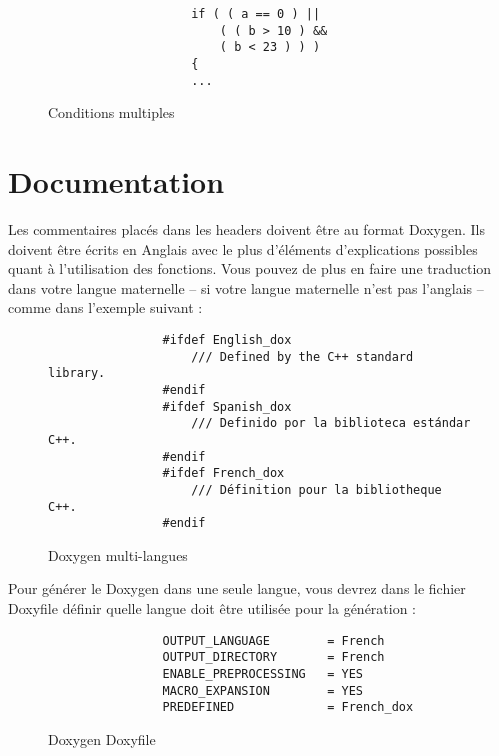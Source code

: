 			\begin{figure}[H]
				\begin{changemargin}{-2.5cm}{-2.5cm}
				\begin{tcolorbox}
				\begin{verbatim}
					if ( ( a == 0 ) ||
					    ( ( b > 10 ) &&
					    ( b < 23 ) ) )
					{
					...
				\end{verbatim}
				\end{tcolorbox}
				\end{changemargin}
				\caption{Conditions multiples}
			\end{figure}

	\section{Documentation}
		Les commentaires placés dans les headers doivent être au format Doxygen. Ils doivent être écrits en Anglais avec le plus d'éléments d'explications possibles quant à l'utilisation des fonctions. Vous pouvez de plus en faire une traduction dans votre langue maternelle -- si votre langue maternelle n'est pas l'anglais -- comme dans l'exemple suivant :

		\begin{figure}[H]
			\begin{changemargin}{-2.5cm}{-2.5cm}
			\begin{tcolorbox}
			\begin{verbatim}
				#ifdef English_dox 
				    /// Defined by the C++ standard library. 
				#endif
				#ifdef Spanish_dox
				    /// Definido por la biblioteca estándar C++. 
				#endif
				#ifdef French_dox
				    /// Définition pour la bibliotheque C++. 
				#endif
			\end{verbatim}
			\end{tcolorbox}
			\end{changemargin}
			\caption{Doxygen multi-langues}
		\end{figure}

		Pour générer le Doxygen dans une seule langue, vous devrez dans le fichier Doxyfile définir quelle langue doit être utilisée pour la génération :

		\begin{figure}[H]
			\begin{changemargin}{-2.5cm}{-2.5cm}
			\begin{tcolorbox}
			\begin{verbatim}
				OUTPUT_LANGUAGE        = French
				OUTPUT_DIRECTORY       = French
				ENABLE_PREPROCESSING   = YES
				MACRO_EXPANSION        = YES
				PREDEFINED             = French_dox
			\end{verbatim}
			\end{tcolorbox}
			\end{changemargin}
			\caption{Doxygen Doxyfile}
		\end{figure}

